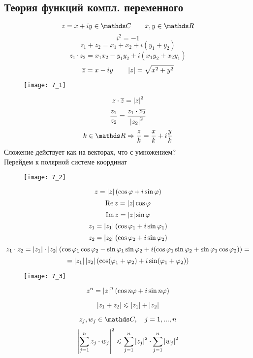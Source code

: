 \documentclass[12pt, fleqn]{article}
\begin{document}
\begin{lect}
		\section{Теория функций компл. переменного}
		\begin{Reminder}
		    \[z = x + iy \in \CC \qq x, y \in \R\]
			\[i^2 = -1\]
			\[z_1 + z_2 = x_1 + x_2 + i(y_1 + y_2)\]
			\[z_1 \cdot z_2 = x_1 x_2 - y_1 y_2 + i(x_1 y_2  + x_2 y_1)\]
			\[\overline{z} = x - iy \qquad \left|z\right| = \sqrt{x^2 + y^2}\]
      \begin{figure}[H]
        \centering
        \texttt{[image: 7\_1]}
      \end{figure}
			\[z \cdot \overline{z} = \left|z\right|^2\]
			\[\frac{z_1}{z_2} = \frac{z_1 \cdot \overline{z_2}}{\left|z_2\right|^2}\]
			\[k \in \R \Ra \frac{z}{k} = \frac{x}{k} + i \frac{y}{k}\]
			Сложение действует как на векторах, что с умножением?\\
			Перейдем к полярной системе координат
      \begin{figure}[H]
        \centering
        \texttt{[image: 7\_2]}
      \end{figure}
			\[z = \left|z\right| (\cos \varphi + i \sin \varphi)\]
			\[\mathop{\rm Re}\nolimits z = \left|z\right| \cos \varphi\]
			\[\mathop{\rm Im}\nolimits z = \left|z\right| \sin \varphi\]
			\[z_1 = \left|z_1\right| (\cos \varphi_1 + i \sin \varphi_1)\]
			\[z_2 = \left|z_2\right| (\cos \varphi_2 + i \sin \varphi_2)\]
			\[z_1 \cdot z_2 = \left|z_1\right| \cdot \left|z_2\right|
			(\cos \varphi_1 \cos \varphi_2 - \sin \varphi_1 \sin \varphi_2
		    +i(\cos \varphi_1 \sin \varphi_2 + \sin \varphi_1 \cos \varphi_2)) = \]
			\[ = \left|z_1\right| \left|z_2\right| (\cos(\varphi_1 + \varphi_2) +
			i \sin (\varphi_1 + \varphi_2))\]
      \begin{figure}[H]
        \centering
        \texttt{[image: 7\_3]}
      \end{figure}
		\end{Reminder}

		\begin{Theorem} [Ф-ла Муавра]
			\[z^n = \left|z\right|^n (\cos{n \varphi} + i \sin n \varphi )\]
		\end{Theorem}

		\begin{Definition} [н-во \bigtriangleup]
			\[\left|z_1 + z_2\right| \leqslant \left|z_1\right| + \left|z_2\right|\]
		\end{Definition}

		\begin{Definition} [н-во Коши]
		    \[z_j, w_j \in \CC, \q j = 1, ..., n\]
			\[\left|\sum_{j = 1}^n z_j \cdot w_j\right|^2 \leqslant \sum_{j = 1}^n
			\left|z_j\right|^2 \cdot \sum_{j = 1}^n \left|w_j\right|^2 \]
		\end{Definition}


\end{lect}
\end{document}
